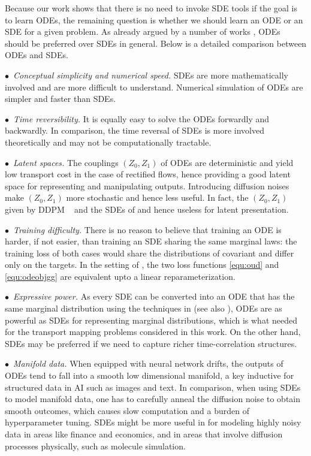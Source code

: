 \documentclass[11pt]{article}
\begin{document}
Because our work shows that there is no need to invoke SDE tools if the goal is to learn ODEs,
the remaining question is 
whether we should learn an ODE or an SDE 
for a given problem. 
As already argued by a number of works 
\citep{song2020score,song2020denoising, elucidating},  
ODEs should be preferred over SDEs in general. 
Below is a detailed comparison between ODEs and SDEs. 


 $\bullet$~\emph{Conceptual simplicity and numerical speed.} %
 SDEs are more mathematically involved and  are more difficult to understand.  Numerical simulation of ODEs are simpler and faster than SDEs. 


$\bullet$~\emph{Time reversibility.} 
It is equally easy to 
solve the ODEs 
forwardly and backwardly.  
In comparison, the time reversal of 
SDEs  \citep[e.g.,][]{anderson1982reverse, haussmann1986time, follmer1985entropy} 
is more involved theoretically and may not be computationally tractable. %


 $\bullet$~\emph{Latent spaces.} 
 The couplings $(Z_0,Z_1)$ 
 of ODEs are deterministic and yield low transport cost in the case of rectified flows, 
 hence providing  a good latent space for representing and manipulating outputs. 
 Introducing diffusion noises 
 make $(Z_0,Z_1)$ more stochastic and hence less useful. In fact, the $(Z_0,Z_1)$ given by DDPM ~\cite{ho2020denoising} and the SDEs of \cite{song2020score} and hence useless for latent presentation. 

 
 $\bullet$~\emph{Training difficulty.}  
 There is no reason to believe 
that training an ODE is harder, if not easier, 
than training an SDE sharing the same marginal laws: the training loss of both cases would  share the distributions of covariant and differ only on the targets. In the setting of \citep{song2020score}, the two loss functions \eqref{equ:oud} and \eqref{equ:odeobjgg} are equivalent upto a linear reparameterization.


$\bullet$~\emph{Expressive power.}   
As every SDE can be converted into an ODE that has the same marginal distribution using the techniques in \cite{song2020denoising, song2020score} (see also \cite{villani2009optimal}), ODEs are as powerful as SDEs for representing marginal distributions,
which is what needed for the transport mapping problems considered in this work. 
On the other hand, SDEs may be preferred if we need to capture richer time-correlation structures. 

 $\bullet$~\emph{Manifold data.}
 When equipped with neural network drifts, 
 the outputs of ODEs tend to fall into a smooth low dimensional manifold,  a key inductive for 
  structured data in AI such as images and text. %
 In comparison, 
 when using SDEs to model manifold data,
 one has to carefully anneal the diffusion noise 
 to obtain smooth outcomes, which  causes slow computation and a burden of hyperparameter tuning. 
 SDEs might be more useful in 
 for modeling highly noisy data in areas like finance and economics, and in 
areas  that involve diffusion processes physically, such as molecule simulation. 
\end{document}
